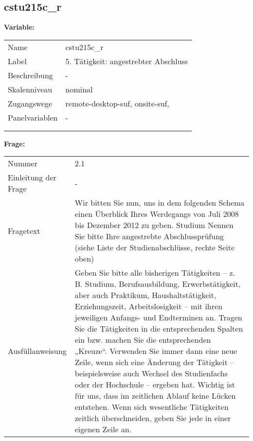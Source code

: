 	
	
	\subsection{cstu215c\_r}
	\label{subSection:cstu215c_r}

	\noindent\textbf{Variable:}\\
		\begin{tabular}{lL{11.3cm}}
			\label{tableVariable:cstu215c_r}
			Name & cstu215c\_r \\
			Label & 5. Tätigkeit: angestrebter Abschluss \\
			Beschreibung & - \\
			Skalenniveau & nominal \\
			Zugangswege &
				remote-desktop-suf,
				onsite-suf,
 \\
			Panelvariablen & -
			 \\
			 \\
 \\
		\end{tabular}

		\vspace*{1 cm}
		\noindent\textbf{Frage:}\\
		\begin{tabular}{lL{11.3cm}}
			\label{tableQuestion:cstu215c_r}
			Nummer & 2.1 \\
			Einleitung der Frage & - \\
			Fragetext & Wir bitten Sie nun, uns in dem folgenden Schema einen Überblick Ihres Werdegangs von Juli 2008 bis Dezember 2012 zu geben.
Studium
Nennen Sie bitte Ihre angestrebte Abschlussprüfung 
(siehe Liste der Studienabschlüsse, rechte Seite oben) \\
			Ausfüllanweisung & Geben Sie bitte alle bisherigen Tätigkeiten – z. B. Studium, Berufsausbildung, Erwerbstätigkeit, aber auch Praktikum, Haushaltstätigkeit,
Erziehungszeit, Arbeitslosigkeit – mit ihren jeweiligen Anfangs- und Endterminen an. Tragen Sie die Tätigkeiten in die entsprechenden Spalten ein bzw. machen Sie die entsprechenden „Kreuze“. Verwenden Sie immer dann eine neue Zeile, wenn sich eine Änderung der Tätigkeit – beispielsweise auch Wechsel des Studienfachs oder der Hochschule – ergeben hat. Wichtig ist für uns, dass im zeitlichen Ablauf keine Lücken entstehen. Wenn sich wesentliche Tätigkeiten zeitlich überschneiden, geben Sie jede in einer eigenen Zeile an. \\
		\end{tabular}






